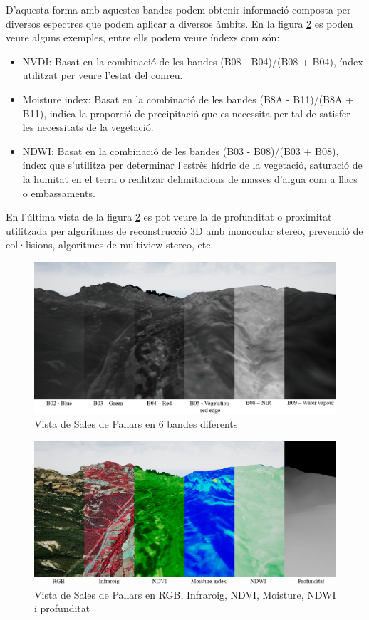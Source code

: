 \documentclass[10pt,a4paper,twocolumn,twoside]{article}
\begin{document}
D'aquesta forma amb aquestes bandes podem obtenir informació composta per diversos espectres que podem aplicar a diversos àmbits. En la figura \ref{fig-spectralindexes} es poden veure alguns exemples, entre ells podem veure índexs com són:

\begin{itemize}
\item 
{
	NVDI\cite{ndvi}: Basat en la combinació de les bandes (B08 - B04)/(B08 + B04), índex utilitzat per veure l'estat del conreu.
}
\item
{
	Moisture index\cite{moisture}: Basat en la combinació de les bandes (B8A - B11)/(B8A + B11), indica la proporció de precipitació que es necessita per tal de satisfer les necessitats de la vegetació.
}
\item
{
	NDWI\cite{ndwi}: Basat en la combinació de les bandes (B03 - B08)/(B03 + B08), índex que s'utilitza per determinar l'estrès hídric de la vegetació, saturació de la humitat en el terra o realitzar delimitacions de masses d'aigua com a llacs o embassaments.
}
\end{itemize} 

En l'última vista de la figura \ref{fig-spectralindexes} es pot veure la de profunditat o proximitat utilitzada per algoritmes de reconstrucció 3D amb monocular stereo, prevenció de col·lisions, algoritmes de multiview stereo, etc.

\begin{figure}[!h]
\centering
  	\includegraphics[width=1\textwidth]{multispectral/bands}
	\caption{Vista de Sales de Pallars en 6 bandes diferents}
	\label{fig-bands}
\end{figure}

\begin{figure}[!h]
\centering
  	\includegraphics[width=1\textwidth]{multispectral/spectralindexes}
	\caption{Vista de Sales de Pallars en RGB, Infraroig, NDVI, Moisture, NDWI i profunditat}
	\label{fig-spectralindexes}
\end{figure}
\end{document}
